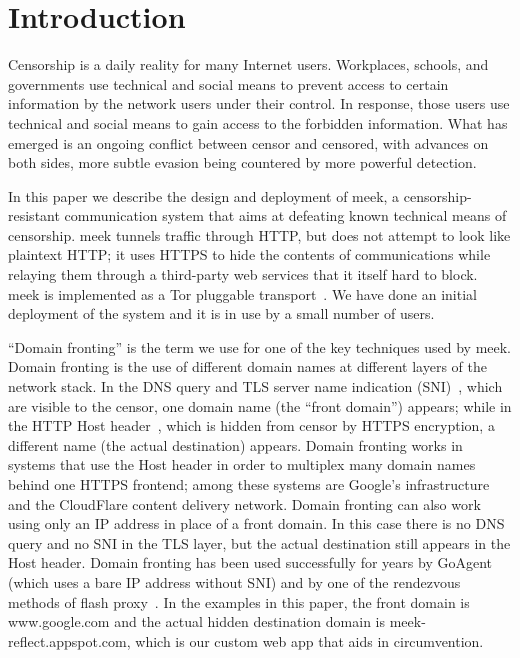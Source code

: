 \documentclass[conference]{IEEEtran}
\begin{document}
\section{Introduction}


Censorship is a daily reality for many Internet users.
Workplaces, schools, and governments use technical and social means
to prevent access to certain information by the network users under their control.
In response, those users use technical and social means
to gain access to the forbidden information.
What has emerged is an ongoing conflict between censor and censored,
with advances on both sides, more subtle evasion being countered by more powerful detection.

In this paper we describe the design and deployment of meek,
a censorship-resistant communication system that aims at defeating
known technical means of censorship.
meek tunnels traffic through HTTP, but does not attempt to look like plaintext HTTP;
it uses HTTPS to hide the contents of communications
while relaying them through a third-party web services that it itself hard to block.
meek is implemented as a Tor pluggable transport~\cite{pt}.
We have done an initial deployment of the system and it is in use
by a small number of users.

``Domain fronting'' is the term we use for one of the key techniques used by meek.
Domain fronting is the use of different domain names at different layers of the network stack.
In the DNS query and TLS server name indication (SNI)~\cite[Section~3]{rfc6066},
which are visible to the censor, one domain name (the ``front domain'') appears;
while in the HTTP Host header~\cite[Section~14.23]{rfc2616},
which is hidden from censor by HTTPS encryption,
a different name (the actual destination) appears.
Domain fronting works in systems that use the Host header in order to
multiplex many domain names behind one HTTPS frontend;
among these systems are Google's infrastructure and the
CloudFlare content delivery network.
Domain fronting can also work using only an IP address in place of
a front domain. In this case there is no DNS query and no SNI in the TLS layer,
but the actual destination still appears in the Host header.
Domain fronting has been used successfully for years by GoAgent~\cite{goagent}
(which uses a bare IP address without SNI)
and by one of the rendezvous methods of flash proxy~\cite{flashproxy}.
In the examples in this paper, the front domain is www.google.com
and the actual hidden destination domain is meek-reflect.appspot.com,
which is our custom web app that aids in circumvention.
\end{document}
